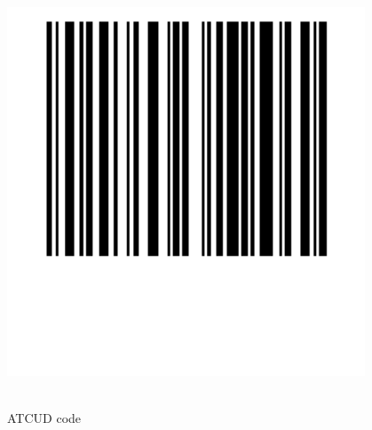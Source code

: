 \documentclass[
	a4paper, %
	9pt, %
]{CSMinimalInvoice}
\begin{document}



\begin{center}
  \includegraphics[width=0.8\textwidth, height=0.2\textheight]{barcode_image.png}
  \\[1ex]
\end{center}


\begin{center}
  \begin{minipage}{0.5\textwidth}
    \centering
    \\[1ex]
    ATCUD code
  \end{minipage}
\end{center}


\outputinvoicenum %
\end{document}
